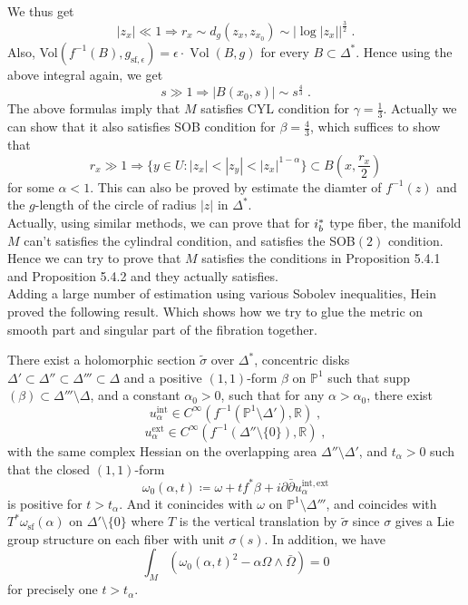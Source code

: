 \indent We thus get
\[ |z_x|\ll 1\Longrightarrow r_x\sim d_g(z_x,z_{x_0})\sim |\log|z_x||^{\frac{3}{2}}\; . \]
\indent Also, Vol$(f^{-1}(B),g_{\mathrm{sf},\epsilon})=\epsilon\cdot\operatorname{Vol}(B,g)$ for every $B\subset \Delta^*$. Hence using the above integral again, we get
\[ s\gg 1\Longrightarrow |B(x_0,s)|\sim s^{\frac{4}{3}}\; . \]
The above formulas imply that $M$ satisfies CYL condition for $\gamma=\frac{1}{3}$. Actually we can show that it also satisfies SOB condition for $\beta=\frac{4}{3}$, which suffices to show that
\[ r_x\gg 1\Longrightarrow \{y\in U:|z_x|<|z_y|<|z_x|^{1-\alpha}\}\subset B(x,\frac{r_x}{2}) \]
for some $\alpha<1$. This can also be proved by estimate the diamter of $f^{-1}(z)$ and the $g$-length of the circle of radius $|z|$ in $\Delta^*$.\\ \indent
Actually, using similar methods, we can prove that for $\uppercase\expandafter{\romannumeral1}_b^*$ type fiber, the manifold $M$ can't satisfies the cylindral condition, and satisfies the SOB$(2)$ condition. Hence we can try to prove that $M$ satisfies the conditions in Proposition 5.4.1 and Proposition 5.4.2 and they actually satisfies.\\ \indent
Adding a large number of estimation using various Sobolev inequalities, Hein proved \cite{hein2012gravitational} the following result. Which shows how we try to glue the metric on smooth part and singular part of the fibration together.
\begin{proposition}
There exist a holomorphic section $\widetilde{\sigma}$ over $\Delta^*$, concentric disks $\Delta'\subset \Delta''\subset\Delta'''\subset\Delta$ and a positive $(1,1)$-form $\beta$ on $\mathbb{P}^1$ such that supp$(\beta)\subset \Delta'''\setminus\Delta$, and a constant $\alpha_0>0$, such that for any $\alpha>\alpha_0$, there exist \[ u_\alpha^{\mathrm{int}}\in C^\infty (f^{-1}(\mathbb{P}^1\setminus\Delta'),\mathbb{R})\; , \]
\[ u_\alpha^{\mathrm{ext}}\in C^\infty (f^{-1}(\Delta''\setminus\{0\}),\mathbb{R})\; , \]
with the same complex Hessian on the overlapping area $\Delta''\setminus\Delta'$, and $t_\alpha>0$ such that the closed $(1,1)$-form
\[ \omega_0(\alpha,t)\coloneq \omega+tf^*\beta+i\partial\bar{\partial}u_{\alpha}^{\mathrm{int,ext}}  \]
is positive for $t>t_\alpha$. And it conincides with $\omega$ on $\mathbb{P}^1\setminus \Delta'''$, and coincides with $T^*\omega_{\mathrm{sf}}(\alpha)$ on $\Delta'\setminus\{0\} $ where $T$ is the vertical translation by $\widetilde{\sigma}$ since $\sigma$ gives a Lie group structure on each fiber with unit $\sigma(s)$. In addition, we have 
\[ \int_M\left(\omega_0(\alpha,t)^2-\alpha\Omega\wedge\bar{\Omega} \right)=0 \]
for precisely one $t>t_\alpha$.
\end{proposition}
